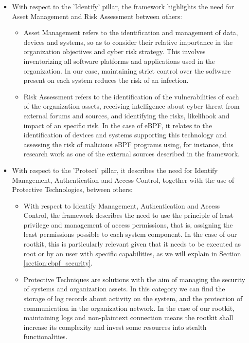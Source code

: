 \begin{itemize}
\item With respect to the 'Identify' pillar, the framework highlights the need for Asset Management and Risk Assessment between others:
	\begin{itemize}
	\item Asset Management refers to the identification and management of data, devices and systems, so as to consider their relative importance in the organization objectives and cyber risk strategy. This involves inventorizing all software platforms and applications used in the organization. In our case, maintaining strict control over the software present on each system reduces the risk of an infection.
	\item Risk Assessment refers to the identification of the vulnerabilities of each of the organization assets, receiving intelligence about cyber threat from external forums and sources, and identifying the risks, likelihook and impact of an specific risk. In the case of eBPF, it relates to the identification of devices and systems supporting this technology and assessing the risk of malicious eBPF programs using, for instance, this research work as one of the external sources described in the framework.
	\end{itemize}
\item With respect to the 'Protect' pillar, it describes the need for Identify Management, Authentication and Access Control, together with the use of Protective Technologies, between others:
	\begin{itemize}
	\item With respect to Identify Management, Authentication and Access Control, the framework describes the need to use the principle of least privilege and management of access permissions, that is, assigning the least permissions possible to each system component. In the case of our rootkit, this is particularly relevant given that it needs to be executed as root or by an user with specific capabilities, as we will explain in Section \ref{section:ebpf_security}.
	\item Protective Techniques are solutions with the aim of managing the security of systems and organization assets. In this category we can find the storage of log records about activity on the system, and the protection of communication in the organization network. In the case of our rootkit, maintaining logs and non-plaintext connection means the rootkit shall increase its complexity and invest some resources into stealth functionalities.

\end{itemize}
\end{itemize}
